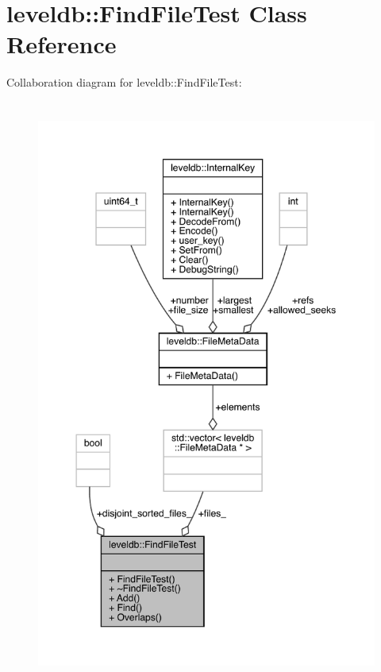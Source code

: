 \hypertarget{classleveldb_1_1_find_file_test}{}\section{leveldb\+::Find\+File\+Test Class Reference}
\label{classleveldb_1_1_find_file_test}


Collaboration diagram for leveldb\+::Find\+File\+Test\+:
\nopagebreak
\begin{figure}[H]
\begin{center}
\leavevmode
\includegraphics[height=550pt]{classleveldb_1_1_find_file_test__coll__graph}
\end{center}
\end{figure}
